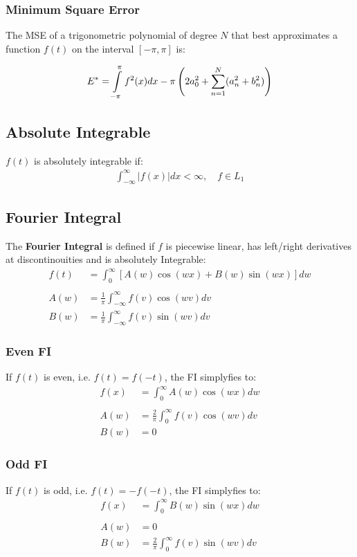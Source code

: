 \subsubsection{Minimum Square Error}
The MSE of a trigonometric polynomial of degree $N$ that best approximates a function $f(t)$ on the interval $[-\pi,\pi]$ is: 
 
\begin{align*}
    E^*=\intop_{-\pi}^\pi f^2(x)dx-\pi\left(2a_0^2+\sum_{n=1}^N(a_n^2+b_n^2)\right)
\end{align*}

\subsection{Absolute Integrable}
$f(t)$ is absolutely integrable if:
\begin{align*}
    \int_{-\infty}^{\infty}\left|f(x)\right|dx<\infty ,\quad f\in L_1
\end{align*}
\subsection{Fourier Integral}
The \textbf{Fourier Integral} is defined if $f$ is piecewise linear, has left/right derivatives at 
discontinouities and is absolutely Integrable:
\begin{align*}
    f(t)&=\int_0^\infty[A(w)\cos(wx)+B(w)\sin(wx)]dw\\\\
    A(w)&=\frac1\pi\int_{-\infty}^{\infty}f(v)\cos(wv)dv\\
    B(w)&=\frac1\pi\int_{-\infty}^{\infty}f(v)\sin(wv)dv
\end{align*}

\subsubsection{Even FI}
If $f(t)$ is even, i.e. $f(t)=f(-t)$, the FI simplyfies to:
\begin{align*}
    f(x)&=\int_0^\infty A(w)\cos(wx)dw\\\\
    A(w)&=\frac2\pi\int_0^\infty f(v)\cos(wv)dv\\
    B(w)&=0
\end{align*}
\subsubsection{Odd FI}
If $f(t)$ is odd, i.e. $f(t)=-f(-t)$, the FI simplyfies to:
\begin{align*}
    f(x)&=\int_0^\infty B(w)\sin(wx)dw\\\\
    A(w)&=0\\
    B(w)&=\frac2\pi\int_0^\infty f(v)\sin(wv)dv
\end{align*}


